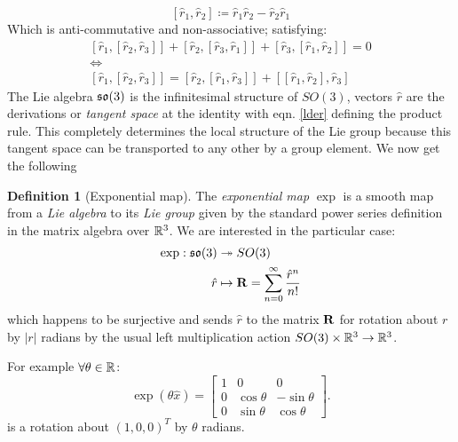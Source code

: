 \documentclass{amsart}
\theoremstyle{plain}
\theoremstyle{definition}
\newtheorem*{definition}{Definition}
\begin{document}
    \begin{equation}
        \left[\hat{r}_1,\hat{r}_2\right]\coloneqq\hat{r}_1\hat{r}_2-\hat{r}_2\hat{r}_1
    \end{equation}
    Which is anti-commutative and non-associative; satisfying:
    \begin{gather}
        \left[\hat{r}_1,\left[\hat{r}_2,\hat{r}_3\right]\right]+\left[\hat{r}_2,\left[\hat{r}_3,\hat{r}_1\right]\right]+\left[\hat{r}_3,\left[\hat{r}_1,\hat{r}_2\right]\right]=0\nonumber\\
        \iff\nonumber\\
        \left[\hat{r}_1,\left[\hat{r}_2,\hat{r}_3\right]\right] = \left[\hat{r}_2,\left[\hat{r}_1,\hat{r}_3\right]\right] +\left[\left[\hat{r}_1,\hat{r}_2\right],\hat{r}_3\right]\label{lder}
    \end{gather}
    The Lie algebra $\mathfrak{so}(3)$ is the infinitesimal structure of $SO(3)$, vectors $\hat{r}$ are the derivations or \emph{tangent space} at the identity with eqn. \ref{lder} defining the product rule. This completely determines the local structure of the Lie group because this tangent space can be transported to any other by a group element.
    We now get the following
    \begin{definition}[Exponential map]
       The \emph{exponential map} $\exp$ is a smooth map from a \emph{Lie algebra} to its \emph{Lie group} given by the standard power series definition in the matrix algebra over $\mathbb{R}^3$. We are interested in the particular case: 
       \begin{align}
            \exp:\mathfrak{so}(3)&\twoheadrightarrow SO(3)\\
            \hat{r}&\mapsto \mathbf{R}=\sum_{n=0}^\infty\frac{\hat{r}^n}{n!}\nonumber
        \end{align}
        which happens to be surjective and sends $\hat{r}$ to the matrix $\mathbf{R}$ for rotation about $r$ by $|r|$ radians by the usual left multiplication action $SO(3)\times \mathbb{R}^3\to \mathbb{R}^3$.
    \end{definition}
    
     For example $\forall\theta\in\mathbb{R}$:
    \begin{equation}
        \exp(\theta\hat{x}) = \begin{bmatrix}
        1 & 0 & 0 \\
        0 & \cos{\theta} & -\sin{\theta} \\
        0 & \sin{\theta} & \cos{\theta}
        \end{bmatrix}.
    \end{equation}
    is a rotation about $(1,0,0)^T$ by $\theta$ radians.
\end{document}
